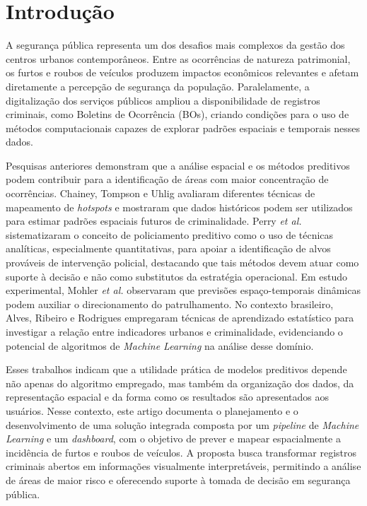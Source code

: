 \documentclass[12pt]{article}
\begin{document}
\section{Introdução}
A segurança pública representa um dos desafios mais complexos da gestão dos centros urbanos contemporâneos. Entre as ocorrências de natureza patrimonial, os furtos e roubos de veículos produzem impactos econômicos relevantes e afetam diretamente a percepção de segurança da população. Paralelamente, a digitalização dos serviços públicos ampliou a disponibilidade de registros criminais, como Boletins de Ocorrência (BOs), criando condições para o uso de métodos computacionais capazes de explorar padrões espaciais e temporais nesses dados.

Pesquisas anteriores demonstram que a análise espacial e os métodos preditivos podem contribuir para a identificação de áreas com maior concentração de ocorrências. Chainey, Tompson e Uhlig \cite{chainey2008} avaliaram diferentes técnicas de mapeamento de \textit{hotspots} e mostraram que dados históricos podem ser utilizados para estimar padrões espaciais futuros de criminalidade. Perry \textit{et al.} \cite{perry2013} sistematizaram o conceito de policiamento preditivo como o uso de técnicas analíticas, especialmente quantitativas, para apoiar a identificação de alvos prováveis de intervenção policial, destacando que tais métodos devem atuar como suporte à decisão e não como substitutos da estratégia operacional. Em estudo experimental, Mohler \textit{et al.} \cite{mohler2015} observaram que previsões espaço-temporais dinâmicas podem auxiliar o direcionamento do patrulhamento. No contexto brasileiro, Alves, Ribeiro e Rodrigues \cite{alves2018} empregaram técnicas de aprendizado estatístico para investigar a relação entre indicadores urbanos e criminalidade, evidenciando o potencial de algoritmos de \textit{Machine Learning} na análise desse domínio.

Esses trabalhos indicam que a utilidade prática de modelos preditivos depende não apenas do algoritmo empregado, mas também da organização dos dados, da representação espacial e da forma como os resultados são apresentados aos usuários. Nesse contexto, este artigo documenta o planejamento e o desenvolvimento de uma solução integrada composta por um \textit{pipeline} de \textit{Machine Learning} e um \textit{dashboard}, com o objetivo de prever e mapear espacialmente a incidência de furtos e roubos de veículos. A proposta busca transformar registros criminais abertos em informações visualmente interpretáveis, permitindo a análise de áreas de maior risco e oferecendo suporte à tomada de decisão em segurança pública.
\end{document}
